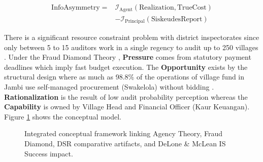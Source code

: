 \documentclass[conference]{IEEEtran}
\begin{document}
\begin{equation}
\begin{aligned}
\mathrm{InfoAsymmetry} = {} & \mathcal{I}_{\mathrm{Agent}}(\mathrm{Realization}, \mathrm{TrueCost}) \\
& - \mathcal{I}_{\mathrm{Principal}}(\mathrm{SiskeudesReport})
\end{aligned}
\end{equation}

There is a significant resource constraint problem with district inspectorates since only between 5 to 15 auditors work in a single regency to audit up to 250 villages \cite{ref12}. Under the Fraud Diamond Theory \cite{ref17b}, \textbf{Pressure} comes from statutory payment deadlines which imply fast budget execution. The \textbf{Opportunity} exists by the structural design where as much as 98.8\% of the operations of village fund in Jambi use self-managed procurement (Swakelola) without bidding \cite{ref9}. \textbf{Rationalization} is the result of low audit probability perception whereas the \textbf{Capability} is owned by Village Head and Financial Officer (Kaur Keuangan). Figure \ref{fig:conceptual_framework} shows the conceptual model.

\begin{figure}[htbp]
\centering
{}

\caption{Integrated conceptual framework linking Agency Theory, Fraud Diamond, DSR comparative artifacts, and DeLone \& McLean IS Success impact.}
\label{fig:conceptual_framework}
\end{figure}
\end{document}
